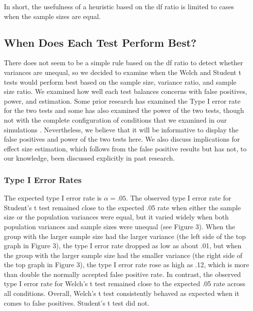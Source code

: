 \documentclass[man,a4paper,noextraspace,apacite]{apa6}
\begin{document}
In short, the usefulness of a heuristic based on the df ratio is limited to cases when the sample sizes are equal. 

\subsection{When Does Each Test Perform Best?}
    There does not seem to be a simple rule based on the df ratio to detect whether variances are unequal, so we decided to examine when the Welch and Student t tests would perform best based on the sample size, variance ratio, and sample size ratio. We examined how well each test balances concerns with false positives, power, and estimation. Some prior research has examined the Type I error rate for the two tests \cite{Boneau1960, Zimmerman1993, Zimmerman2004, Zimmerman1996, Zimmerman2009} and some has also examined the power of the two tests, though not with the complete configuration of conditions that we examined in our simulations \cite{Neuhauser2002, Zimmerman1993}. Nevertheless, we believe that it will be informative to display the false positives and power of the two tests here. We also discuss implications for effect size estimation, which follows from the false positive results but has not, to our knowledge, been discussed explicitly in past research.
    
\subsubsection{Type I Error Rates}

    The expected type I error rate is $\alpha = .05$. The observed type I error rate for Student's t test remained close to the expected .05 rate when either the sample size or the population variances were equal, but it varied widely when both population variances and sample sizes were unequal (see Figure 3). When the group with the larger sample size had the larger variance (the left side of the top graph in Figure 3), the type I error rate dropped as low as about .01, but when the group with the larger sample size had the smaller variance (the right side of the top graph in Figure 3), the type I error rate rose as high as .12, which is more than double the normally accepted false positive rate. In contrast, the observed type I error rate for Welch's t test remained close to the expected .05 rate across all conditions. Overall, Welch's t test consistently behaved as expected when it comes to false positives. Student's t test did not.
\end{document}
